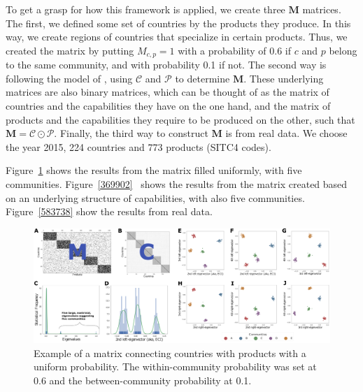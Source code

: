 \documentclass[12pt]{article}
\newcommand{\mtx}[1]{\mathbf{ #1}}
\begin{document}
To get a grasp for how this framework is applied, we create three $\mtx{M}$ matrices. The first, we defined some set of countries by the products they produce. In this way, we create regions of countries that specialize in certain products. Thus, we created the matrix by putting $M_{c,p}=1$ with a probability of 0.6 if $c$ and $p$ belong to the same community, and with probability 0.1 if not. The second way is following the model of \citet{HausmannHidalgo2011}, using $\mtx{{\mathcal C}}$ and $\mtx{{\mathcal P}}$ to determine $\mtx{M}$. These underlying matrices are also binary matrices, which can be thought of as the matrix of countries and the capabilities they have on the one hand, and the matrix of products and the capabilities they require to be produced on the other, such that $\mtx{M}=\mtx{{\mathcal C}} \odot \mtx{{\mathcal P}}$. Finally, the third way to construct $\mtx{M}$ is from real data. We choose the year 2015, 224 countries and 773 products (SITC4 codes). 




Figure~{\ref{340547}} shows the results from the matrix
filled uniformly, with five communities.
Figure~{\ref{369902}} ~shows the results from the
matrix created based on an underlying structure of capabilities, with
also five communities. Figure~{\ref{583738}} show the
results from real data.

\begin{figure}[h]
\begin{center}
\includegraphics[width=\textwidth]{allfigs_uniform_wide.png}
\caption{{Example of a matrix connecting countries with products with a uniform
probability. The within-community probability was set at 0.6 and the
between-community probability at 0.1.
{\label{340547}}%
}}
\end{center}
\end{figure}
\end{document}
